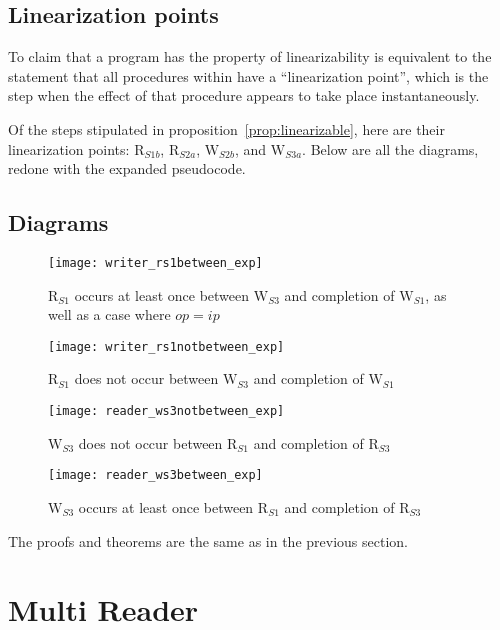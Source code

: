 \documentclass{article}
\newcommand\RS[1]{\ensuremath{\text{R}_{S#1}}}
\newcommand\WS[1]{\ensuremath{\text{W}_{S#1}}}
\newcommand\R[1]{\ensuremath{r\left[#1\right]}}
\newcommand\ip{\ensuremath{ip}}
\newcommand\op{\ensuremath{op}}
\begin{document}
\subsection{Linearization points}
To claim that a program has the property of linearizability is
equivalent to the statement that all procedures within have a
``linearization point'', which is the step when the effect of that
procedure appears to take place instantaneously.

Of the steps stipulated in proposition~\ref{prop:linearizable}, here
are their linearization points: \RS{1b}, \RS{2a}, \WS{2b}, and
\WS{3a}. Below are all the diagrams, redone with the expanded
pseudocode.

\subsection{Diagrams}

\begin{figure*}[h!]
  \centering
  \texttt{[image: writer\_rs1between\_exp]}
  \caption{\RS1 occurs at least once between \WS3 and completion of \WS1, as well as a case where $\op=\ip$}
  \label{fig:l4i1exp}
\end{figure*}

\begin{figure*}[h!]
  \centering
  \texttt{[image: writer\_rs1notbetween\_exp]}
  \caption{\RS1 does not occur between \WS 3 and completion of \WS 1}
  \label{fig:l3i1exp}
\end{figure*}

\begin{figure*}[h!]
  \centering
  \texttt{[image: reader\_ws3notbetween\_exp]}
  \caption{\WS 3 does not occur between \RS 1 and completion of \RS 3}
  \label{fig:l1i1exp}
\end{figure*}

\begin{figure*}[h!]
  \centering
  \texttt{[image: reader\_ws3between\_exp]}
  \caption{\WS 3 occurs at least once between \RS 1 and completion of \RS 3}
  \label{fig:l1i2exp}
\end{figure*}

The proofs and theorems are the same as in the previous section.

\section{Multi Reader}
\renewcommand\RS[2]{\ensuremath{\text{R}^{#1}_{S#2}}}
\renewcommand\R[2]{\ensuremath{r_{#1}\left[#2\right]}}
\end{document}
